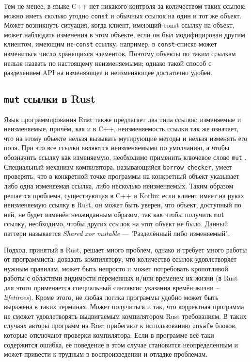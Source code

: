 \documentclass[specification,annotation,times]{itmo-student-thesis}
\begin{document}
Тем не менее, в языке C++ нет никакого контроля за количеством таких ссылок: можно иметь сколько угодно \texttt{const} и обычных ссылок на один и тот же объект. Может возникнуть ситуация, когда клиент, имеющий const ссылку на объект, может наблюдать изменения в этом объекте, если он был модифицирован другим клиентом, имеющим не-\texttt{const} ссылку: например, в \texttt{const}-списке может измениться число хранящихся элементов.
Поэтому объекты по таким ссылкам нельзя назвать по настоящему неизменяемыми; однако такой способ с разделением API на изменяющее и неизменяющее достаточно удобен.

\subsection{\texttt{mut} ссылки в Rust}

Язык программирования Rust также предлагает два типа ссылок: изменяемые и неизменяемые, причём, как и в C++, неизменяемость ссылки так же означает, что на этому объекте нельзя вызывать мутирующие методы и нельзя изменять его поля. При это все ссылки являются неизменяемыми по умолчанию, а чтобы обозначить ссылку как изменяемую, необходимо применить ключевое слово \texttt{mut} \cite{rust-mut}. 
Специальный механизм компилятора, называющийся \texttt{borrow checker}, умеет проверять, что в конкретной точке программы на конкретный объект указывает либо одна изменяемая ссылка, либо несколько неизменяемых.
Таким образом решается проблема, существующая в C++ и Kotlin: если клиент имеет на руках неизменяемую ссылку в Rust, он может быть уверен, что объект, доступный по ней, не будет изменён неожиданным образом, так как чтобы получить \texttt{mut} ссылку, необходимо, чтобы других ссылок на этот объект не было.
Данный паттерн называется \textit{Shared xor mutable} --- "Разделённый либо изменяемый".

Подход, принятый в Rust, решает много проблем, однако и требует много работы от программиста: доказать компилятору, что количество ссылок удовлетворяет нужным правилам, может быть непросто и может потребовать кропотливой работы с областями видимости переменных и/или временем их жизни (в Rust для этого применяется специальный синтаксис указания времён жизни -- \textit{lifetimes}).
Кроме этого, не любая логика программы удобно может быть выражена в таких терминах. Может получиться и так, что корректная программа не сможет удовлетворять выдвигаемым компилятором Rust требованиям.
В таких случаях авторы программ на Rust прибегают к использованию \texttt{unsafe} блоков, которые отключают проверки компилятора.
Если в программе всё-таки содержится ошибка, её поведение в этом случае становится неопределённым и может привести к трудным в воспроизведении и отладке проблемам.
\end{document}

